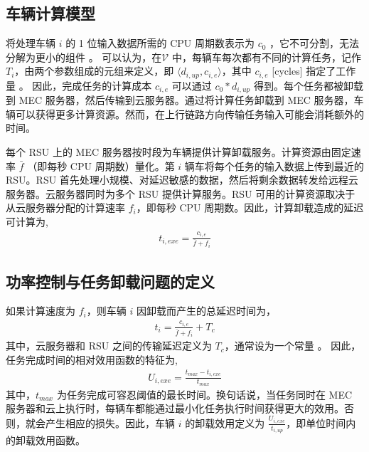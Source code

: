 \subsection{车辆计算模型}\label{section3-2-2}
将处理车辆 $i$ 的 1 位输入数据所需的 CPU 周期数表示为 $c_0$ \supercite{Zhang2017}，它不可分割，无法分解为更小的组件 \supercite{Saleem2021}。
可以认为，在$ \mathcal{V}$ 中，每辆车每次都有不同的计算任务，记作 $T_i$，由两个参数组成的元组来定义，即 $\langle d_{i,up}, c_{i,e}\rangle$，其中 $c_{i,e}$ [cycles] 指定了工作量 \supercite{Tran2019}。 因此，完成任务的计算成本 $c_{i,e}$ 可以通过 $c_{0}*d_{i,up}$ 得到。每个任务都被卸载到 MEC 服务器，然后传输到云服务器。通过将计算任务卸载到 MEC 服务器，车辆可以获得更多计算资源。然而，在上行链路方向传输任务输入可能会消耗额外的时间。

每个 RSU 上的 MEC 服务器按时段为车辆提供计算卸载服务。计算资源由固定速率 $\bar{f}$ （即每秒 CPU 周期数）量化。第 $i$ 辆车将每个任务的输入数据上传到最近的 RSU。RSU 首先处理小规模、对延迟敏感的数据，然后将剩余数据转发给远程云服务器。{云服务器同时为多个 RSU 提供计算服务。RSU 可用的计算资源取决于从云服务器分配的计算速率 $f_i$，}即每秒 CPU 周期数。因此，计算卸载造成的延迟可计算为,
\begin{eqnarray}\label{E8}
t_{i,exe}=\frac{c_{i,e}}{\bar{f}+f_i}
\end{eqnarray}
\subsection{功率控制与任务卸载问题的定义}\label{section3-2-3}

如果计算速度为 $f_i$，则车辆 $i$ 因卸载而产生的总延迟时间为，
\begin{eqnarray}\label{E9}
 t_i=\frac{c_{i,e}}{\bar{f}+f_i}+T_c
\end{eqnarray}
其中，云服务器和 RSU 之间的传输延迟定义为 $T_c$，通常设为一个常量 \cite{Xiao2020}。 因此，任务完成时间的相对效用函数的特征为,
\begin{eqnarray}\label{E10}
U_{i,exe}=\frac{t_{max}-t_{i,exe}}{t_{max}}
\end{eqnarray}
其中，$t_{max}$ 为{任务完成可容忍阈值的最长时间}。换句话说，当任务同时在 MEC 服务器和云上执行时，每辆车都能通过最小化任务执行时间获得更大的效用。否则，就会产生相应的损失。因此，车辆 $i$ 的卸载效用定义为 $\frac{U_{i,exe}}{t_{i,up}}$，即单位时间内的卸载效用函数。

